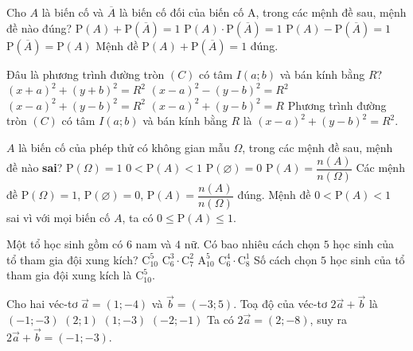\begin{ex}%
	Cho $A$ là biến cố và $\overline{A}$ là biến cố đối của biến cố A, trong các mệnh đề sau, mệnh đề nào đúng?
	\choice
	{\True $\mathrm{P}(A)+\mathrm{P}(\overline{A})=1$}
	{$\mathrm{P}(A)\cdot\mathrm{P}(\overline{A})=1$}
	{$\mathrm{P}(A)-\mathrm{P}(\overline{A})=1$}
	{$\mathrm{P}(\overline{A})=\mathrm{P}(A)$}
	\loigiai
	{
		Mệnh đề $\mathrm{P}(A)+\mathrm{P}(\overline{A})=1$ đúng.
	}
\end{ex}
\begin{ex}%
	Đâu là phương trình đường tròn $(C)$ có tâm $I(a;b)$ và bán kính bằng $R$?
	\choice
	{$(x+a)^2+(y+b)^2=R^2$}
	{$(x-a)^2-(y-b)^2=R^2$}
	{\True $(x-a)^2+(y-b)^2=R^2$}
	{$(x-a)^2+(y-b)^2=R$}
	\loigiai
	{
		Phương trình đường tròn $(C)$ có tâm $I(a;b)$ và bán kính bằng $R$ là $(x-a)^2+(y-b)^2=R^2$.
	}
\end{ex}
\begin{ex}%
	$A$ là biến cố của phép thử có không gian mẫu $\Omega $, trong các mệnh đề sau, mệnh đề nào \textbf{sai}?
	\choice
	{$\mathrm{P}(\Omega)=1$}
	{\True $0<\mathrm{P}(A)<1$}
	{$\mathrm{P}(\varnothing)=0$}
	{$\mathrm{P}(A)=\dfrac{n(A)}{n(\Omega)}$}
	\loigiai
	{
		Các mệnh đề $\mathrm{P}(\Omega)=1$, $\mathrm{P}(\varnothing)=0$, $\mathrm{P}(A)=\dfrac{n(A)}{n(\Omega)}$ đúng. Mệnh đề $0<\mathrm{P}(A)<1$ sai vì với mọi biến cố $A$, ta có $0\le\mathrm{P}(A)\le 1$.
	}
\end{ex}
\begin{ex}%
	Một tổ học sinh gồm có $6$ nam và $4$ nữ. Có bao nhiêu cách chọn $5$ học sinh của tổ tham gia đội xung kích?
	\choice
	{\True $\mathrm{C}_{10}^5$}
	{$\mathrm{C}_6^3\cdot\mathrm{C}_7^2$}
	{$\mathrm{A}_{10}^5$}
	{$\mathrm{C}_6^4\cdot\mathrm{C}_8^1$}
	\loigiai
	{
		Số cách chọn $5$ học sinh của tổ tham gia đội xung kích là $\mathrm{C}_{10}^5$.
	}
\end{ex}
\begin{ex}%
	Cho hai véc-tơ $\overrightarrow{a}=(1;-4)$ và $\overrightarrow{b}=(-3;5)$. Toạ độ của véc-tơ $2\overrightarrow{a}+\overrightarrow{b}$ là
	\choice
	{\True $(-1;-3)$}
	{$(2;1)$}
	{$(1;-3)$}
	{$(-2;-1)$}
	\loigiai
	{
		Ta có $2\overrightarrow{a}=(2;-8)$, suy ra $2\overrightarrow{a}+\overrightarrow{b}=(-1;-3)$.
	}
\end{ex}
